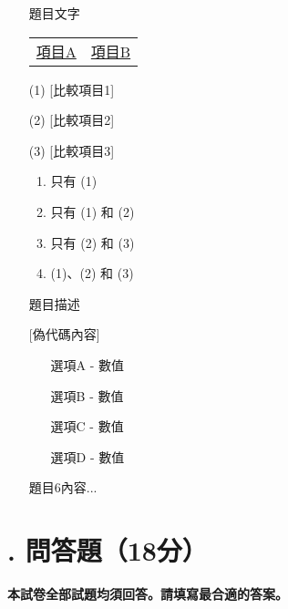 \documentclass[12pt,a4paper]{article}
\newcommand{\essayscore}{18}               %
\begin{document}
\begin{enumerate}
\item [題目文字]

\begin{center}
\begin{tabular}{cc}
\underline{項目A} & \underline{項目B} \\
\end{tabular}
\end{center}

(1) [比較項目1]

(2) [比較項目2]

(3) [比較項目3]

\begin{enumerate}[label=\Alph*.]
\item 只有 (1)
\item 只有 (1) 和 (2)
\item 只有 (2) 和 (3)
\item (1)、(2) 和 (3)
\end{enumerate}

\item [題目描述]

[偽代碼內容]

\begin{enumerate}[label=\Alph*.]
\item [選項A - 數值]
\item [選項B - 數值]
\item [選項C - 數值]
\item [選項D - 數值]
\end{enumerate}

\item [題目6內容...]

\end{enumerate}

\newpage

\section{\textbf{\fontsize{12pt}{14.4pt}. 問答題（\essayscore{}分）}}

\textbf{\fontsize{12pt}{14.4pt}\selectfont 本試卷全部試題均須回答。請填寫最合適的答案。}

\fontsize{12pt}{14.4pt}\selectfont
\end{document}
